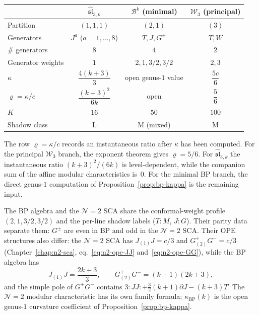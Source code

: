 \begin{center}
\renewcommand{\arraystretch}{1.3}
\begin{tabular}{l|ccc}
\toprule
& $\widehat{\mathfrak{sl}}_{3,k}$ &
$\mathcal{B}^k$ (minimal) &
$\mathcal{W}_3$ (principal) \\
\midrule
Partition & $(1,1,1)$ & $(2,1)$ & $(3)$ \\
Generators & $J^a$ ($a = 1,\ldots,8$) & $T, J, G^\pm$ & $T, W$ \\
$\#$ generators & $8$ & $4$ & $2$ \\
Generator weights & $1$ & $2, 1, 3/2, 3/2$ & $2, 3$ \\
$\kappa$ & $\dfrac{4(k+3)}{3}$ & open genus-$1$ value & $\dfrac{5c}{6}$ \\
$\varrho = \kappa/c$ & $\dfrac{(k+3)^2}{6k}$ & open & $\dfrac{5}{6}$ \\
$K$ & $16$ & $50$ & $100$ \\
Shadow class & L & M (mixed) & M \\
\bottomrule
\end{tabular}
\end{center}

The row $\varrho=\kappa/c$ records an instantaneous ratio after
$\kappa$ has been computed.  For the principal $\mathcal W_3$ branch,
the exponent theorem gives $\varrho=5/6$.  For
$\widehat{\mathfrak{sl}}_{3,k}$ the instantaneous ratio
$(k+3)^2/(6k)$ is level-dependent, while the companion sum of the
affine modular characteristics is~$0$.  For the minimal BP branch, the
direct genus-$1$ computation of Proposition~\ref{prop:bp-kappa} is the
remaining input.

\begin{remark}[Relation to the $\mathcal{N}=2$ SCA]
\label{rem:bp-n2-comparison}
The BP algebra and the $\mathcal{N}=2$ SCA share the conformal-weight
profile $(2,1,3/2,3/2)$ and the per-line shadow labels
($T\colon M$, $J\colon G$).  Their parity data separate them:
$G^\pm$ are even in BP and odd in the $\mathcal N=2$ SCA.  Their OPE
structures also differ:
the $\mathcal{N}=2$ SCA has
$J_{(1)}J = c/3$ and $G^+_{(2)}G^- = c/3$
(Chapter~\ref{chap:n2-sca}, eq.~\eqref{eq:n2-ope-JJ}
and~\eqref{eq:n2-ope-GG}),
while the BP algebra has
\[
J_{(1)}J=\frac{2k+3}{3},\qquad
G^+_{(2)}G^-=(k+1)(2k+3),
\]
and the simple pole of $G^+G^-$ contains
$3{:}JJ{:}+\tfrac32(k+1)\partial J-(k+3)T$.  The
$\mathcal N=2$ modular characteristic has its own family formula;
$\kappa_{\mathrm{BP}}(k)$ is the open genus-$1$ curvature coefficient
of Proposition~\ref{prop:bp-kappa}.
\end{remark}


